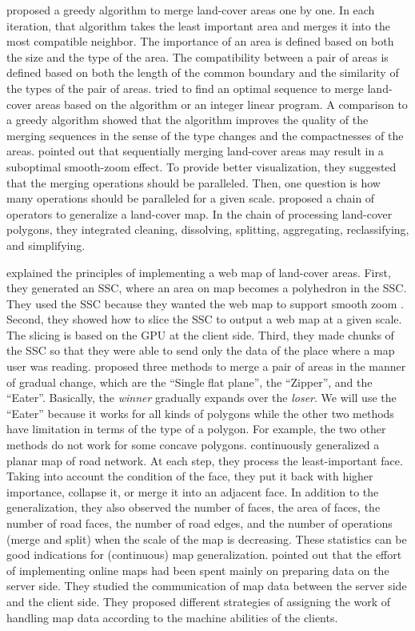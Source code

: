 \documentclass[ijgi,article,submit,moreauthors,pdftex]{Definitions/mdpi}
\begin{document}
\citet{vanOosterom2005} proposed a greedy algorithm 
to merge land-cover areas one by one.
In each iteration, that algorithm takes the least important area and 
merges it into the most compatible neighbor.
The importance of an area is defined 
based on both the size and the type of the area.
The compatibility between a pair of areas is defined based on 
both the length of the common boundary and the similarity of the types 
of the pair of areas. 
\citet[]{Peng2019Thesis} tried to find an optimal sequence 
to merge land-cover areas
based on the \Astar algorithm or an integer linear program.
A comparison to a greedy algorithm showed that 
the \Astar algorithm improves the quality of the merging sequences
in the sense of the type changes and the compactnesses of the areas.
\citet{vanOosterom2014Support} pointed out that sequentially merging
land-cover areas may result in a suboptimal smooth-zoom effect.
To provide better visualization, they suggested that
the merging operations should be paralleled.
Then, one question is how many operations 
should be paralleled for a given scale.
\citet{Thiemann2018LandCover} proposed a chain of operators 
to generalize a land-cover map.
In the chain of processing land-cover polygons, 
they integrated cleaning, dissolving, splitting, aggregating, reclassifying, and simplifying. 


\citet{Meijers2020Web} explained the principles of 
implementing a web map of land-cover areas.
First, they generated an SSC, 
where an area on map becomes a polyhedron in the SSC.
They used the SSC because 
they wanted the web map to support smooth zoom
\citep[see][]{vanOosterom2014Support}.
Second, they showed how to slice the SSC 
to output a web map at a given scale.
The slicing is based on the GPU at the client side.
Third, they made chunks of the SSC 
so that they were able to send only the data of the place
where a map user was reading.
\citet{Suba2014Merge} proposed three methods 
to merge a pair of areas in the manner of gradual change, 
which are the ``Single flat plane'', the ``Zipper'', and the ``Eater''.
Basically, the \emph{winner} gradually expands over the \emph{loser}.
We will use the ``Eater'' because it works for all kinds of polygons 
while the other two methods have limitation 
in terms of the type of a polygon.
For example, the two other methods do not work for some concave polygons.
\citet{Suba2016Road} continuously generalized a planar map of road network.
At each step, they process the least-important face.
Taking into account the condition of the face,
they put it back with higher importance, collapse it, 
or merge it into an adjacent face.
In addition to the generalization, 
they also observed the number of faces,
the area of faces, the number of road faces, the number of road edges,
and the number of operations (merge and split) 
when the scale of the map is decreasing.
These statistics can be good indications 
for (continuous) map generalization.
\citet{Huang2016Webmap} pointed out that
the effort of implementing online maps 
had been spent mainly on preparing data on the server side.
They studied the communication of map data 
between the server side and the client side.
They proposed different strategies of assigning 
the work of handling map data
according to the machine abilities of the clients.
\end{document}
